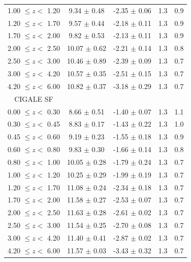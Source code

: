 \begin{table}[ht!]
\begin{center}
\begin{tabular}{ccccc}
        1.00 $\leq z <$ 1.20 &  9.34 $\pm$ 0.48 & -2.35 $\pm$ 0.06 & 1.3 & 0.9 \\
        1.20 $\leq z <$ 1.70 &  9.57 $\pm$ 0.44 & -2.18 $\pm$ 0.11 & 1.3 & 0.9 \\
        1.70 $\leq z <$ 2.00 &  9.82 $\pm$ 0.53 & -2.13 $\pm$ 0.11 & 1.3 & 0.9 \\
        2.00 $\leq z <$ 2.50 & 10.07 $\pm$ 0.62 & -2.21 $\pm$ 0.14 & 1.3 & 0.8 \\
        2.50 $\leq z <$ 3.00 & 10.46 $\pm$ 0.89 & -2.39 $\pm$ 0.09 & 1.3 & 0.7 \\
        3.00 $\leq z <$ 4.20 & 10.57 $\pm$ 0.35 & -2.51 $\pm$ 0.15 & 1.3 & 0.7 \\
        4.20 $\leq z <$ 6.00 & 10.82 $\pm$ 0.37 & -3.18 $\pm$ 0.29 & 1.3 & 0.7 \\
        \hline
        CIGALE SF \\
        \hline
        0.00 $\leq z <$ 0.30 &  8.66 $\pm$ 0.51 & -1.40 $\pm$ 0.07 & 1.3 & 1.1 \\
        0.30 $\leq z <$ 0.45 &  8.83 $\pm$ 0.17 & -1.43 $\pm$ 0.22 & 1.3 & 1.0 \\
        0.45 $\leq z <$ 0.60 &  9.19 $\pm$ 0.23 & -1.55 $\pm$ 0.18 & 1.3 & 0.9 \\
        0.60 $\leq z <$ 0.80 &  9.83 $\pm$ 0.30 & -1.66 $\pm$ 0.14 & 1.3 & 0.8 \\
        0.80 $\leq z <$ 1.00 & 10.05 $\pm$ 0.28 & -1.79 $\pm$ 0.24 & 1.3 & 0.7 \\
        1.00 $\leq z <$ 1.20 & 10.25 $\pm$ 0.29 & -1.99 $\pm$ 0.19 & 1.3 & 0.7 \\
        1.20 $\leq z <$ 1.70 & 11.08 $\pm$ 0.24 & -2.34 $\pm$ 0.18 & 1.3 & 0.7 \\
        1.70 $\leq z <$ 2.00 & 11.58 $\pm$ 0.27 & -2.53 $\pm$ 0.07 & 1.3 & 0.7 \\
        2.00 $\leq z <$ 2.50 & 11.63 $\pm$ 0.28 & -2.61 $\pm$ 0.02 & 1.3 & 0.7 \\
        2.50 $\leq z <$ 3.00 & 11.54 $\pm$ 0.25 & -2.70 $\pm$ 0.08 & 1.3 & 0.7 \\
        3.00 $\leq z <$ 4.20 & 11.40 $\pm$ 0.41 & -2.87 $\pm$ 0.02 & 1.3 & 0.7 \\
        4.20 $\leq z <$ 6.00 & 11.57 $\pm$ 0.03 & -3.43 $\pm$ 0.32 & 1.3 & 0.7 \\      
        \bottomrule
    \end{tabular}
    \end{center}
\end{table}


